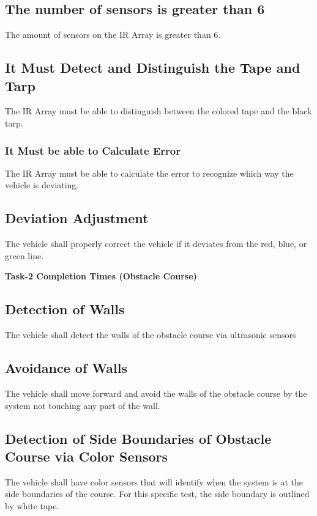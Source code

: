 \documentclass{article}
\begin{document}
\subsection{The number of sensors is greater than 6}
The amount of sensors on the IR Array is greater than 6.

\subsection{It Must Detect and Distinguish the Tape and Tarp}
The IR Array must be able to distinguish between the colored tape and the black tarp.

\subsubsection{It Must be able to Calculate Error}
The IR Array must be able to calculate the error to recognize which way the vehicle is deviating.

\subsection{Deviation Adjustment}
The vehicle shall properly correct the vehicle if it deviates from the red, blue, or green line.\vspace{+3em}\newline

\noindent\textbf{\Large Task-2 Completion Times (Obstacle Course)}
\subsection{Detection of Walls }
The vehicle shall detect the walls of the obstacle course via ultrasonic sensors
\subsection{Avoidance of Walls}
The vehicle shall move forward and avoid the walls of the obstacle course by the system not touching any part of the wall. 

\subsection{Detection of Side Boundaries of Obstacle Course via Color Sensors}
The vehicle shall have color sensors that will identify when the system is at the side boundaries of the course. For this specific test, the side boundary is outlined by white tape.
\end{document}

